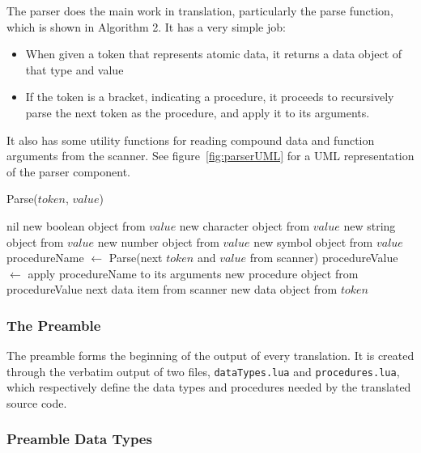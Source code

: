 The parser does the main work in translation, particularly the parse function,
which is shown in Algorithm 2. It has a very simple job:
\begin{itemize}
\item When given a token that represents atomic data, it returns a data object of that type and value
\item If the token is a bracket, indicating a procedure, it proceeds to recursively parse the next token as the procedure, and apply it to its
arguments.
\end{itemize}
It also has some utility functions for reading compound data and function
arguments from the scanner. See figure~\ref{fig:parserUML} for a UML representation of the parser component.

\begin{algorithm}
\caption{Parse($token$, $value$)}
\label{alg:parse}
\begin{algorithmic}
\RETURN nil
\RETURN new boolean object from $value$
\RETURN new character object from $value$
\RETURN new string object from $value$
\RETURN new number object from $value$
\RETURN new symbol object from $value$
\ELSIF{$token$ = $($ or $token$ = $[$}
\STATE procedureName $\leftarrow$ Parse(next $token$ and $value$ from scanner)
\STATE procedureValue $\leftarrow$ apply procedureName to its arguments
\RETURN new procedure object from procedureValue
\RETURN next data item from scanner
\ELSE
\RETURN new data object from $token$
\ENDIF
\end{algorithmic}
\end{algorithm}

\subsubsection{The Preamble}

The preamble forms the beginning of the output of every translation. It is
created through the verbatim output of two files, \texttt{dataTypes.lua} and
\texttt{procedures.lua}, which respectively define the data types and procedures
needed by the translated source code.

\subsubsection{Preamble Data Types}

